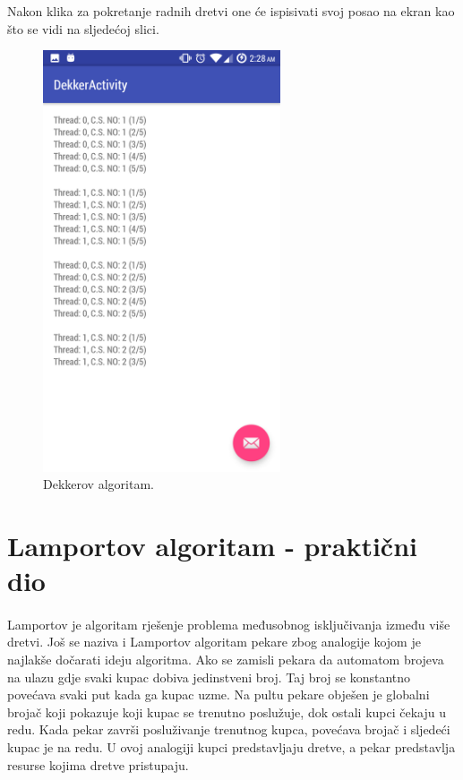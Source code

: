 \documentclass[times, utf8, zavrsni]{fer}
\begin{document}
Nakon klika za pokretanje radnih dretvi one će ispisivati svoj posao na ekran kao što  se vidi na sljedećoj slici.

\begin{figure}[ht!]
\centering
\includegraphics[width=70mm]{img/DekkerActivity.png}
\caption{Dekkerov algoritam.}
\label{overflow}
\end{figure}

\section{Lamportov algoritam - praktični dio}
\paragraph{}
Lamportov je algoritam rješenje problema međusobnog isključivanja između više dretvi. Još se naziva i Lamportov algoritam pekare zbog analogije kojom je najlakše dočarati ideju algoritma. Ako se zamisli pekara da automatom brojeva na ulazu gdje svaki kupac dobiva jedinstveni broj. Taj broj se konstantno povećava svaki put kada ga kupac uzme. Na pultu pekare obješen je globalni brojač koji pokazuje koji kupac se trenutno poslužuje, dok ostali kupci čekaju u redu. Kada pekar završi posluživanje  trenutnog kupca, povećava brojač i sljedeći kupac je na redu. U ovoj analogiji kupci predstavljaju dretve, a pekar predstavlja resurse kojima dretve pristupaju.\\
\end{document}
